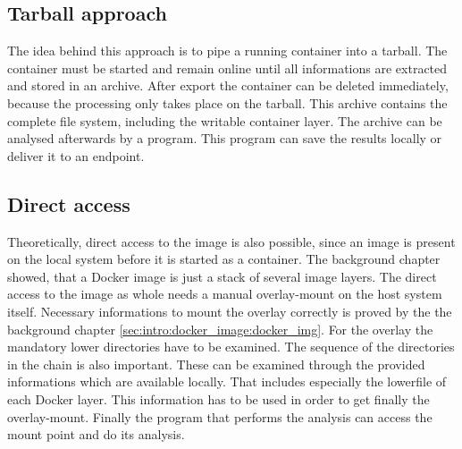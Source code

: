 \subsection{Tarball approach} 
\label{ch:theory:access_eval:tarball}
The idea behind this approach is to pipe a running container into a tarball. The container must be started and remain online until all informations are extracted and stored in an archive.
After export the container can be deleted immediately, because the processing only takes place on the tarball.
This archive contains the complete file system, including the writable container layer. The archive can be analysed afterwards by a program. This program can save the results locally or deliver it to an endpoint.

\subsection{Direct access} 
\label{ch:theory:access_eval:direct_access}
Theoretically, direct access to the image is also possible, since an image is present on the local system before it is started as a container.
The background chapter showed, that a Docker image is just a stack of several image layers. The direct access to the image as whole needs a manual overlay-mount on the host system itself.
Necessary informations to mount the overlay correctly is proved by the the background chapter \ref{sec:intro:docker_image:docker_img}.
For the overlay the mandatory lower directories have to be examined. The sequence of the directories in the chain is also important. These can be examined through the provided informations which are available locally. That includes especially the lowerfile of each Docker layer. This information has to be used in order to get finally the overlay-mount. 
Finally the program that performs the analysis can access the mount point and do its analysis. 

